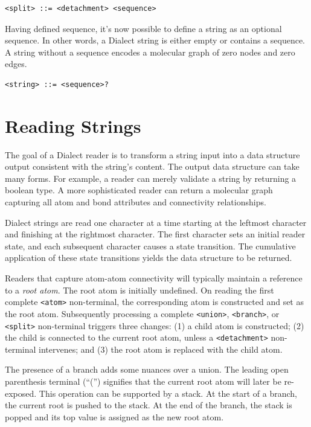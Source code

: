 \documentclass{article}
\def\ttt{\texttt}
\begin{document}
\begin{lstlisting}
<split> ::= <detachment> <sequence>
\end{lstlisting}

Having defined sequence, it's now possible to define a string as an optional sequence. In other words, a Dialect string is either empty or contains a sequence. A string without a sequence encodes a molecular graph of zero nodes and zero edges.

\begin{lstlisting}
<string> ::= <sequence>?
\end{lstlisting}

\section*{Reading Strings}

The goal of a Dialect reader is to transform a string input into a data structure output consistent with the string's content. The output data structure can take many forms. For example, a reader can merely validate a string by returning a boolean type. A more sophisticated reader can return a molecular graph capturing all atom and bond attributes and connectivity relationships.

Dialect strings are read one character at a time starting at the leftmost character and finishing at the rightmost character. The first character sets an initial reader state, and each subsequent character causes a state transition. The cumulative application of these state transitions yields the data structure to be returned.

Readers that capture atom-atom connectivity will typically maintain a reference to a \textit{root atom}. The root atom is initially undefined. On reading the first complete \ttt{<atom>} non-terminal, the corresponding atom is constructed and set as the root atom. Subsequently processing a complete \ttt{<union>}, \ttt{<branch>}, or \ttt{<split>} non-terminal triggers three changes: (1) a child atom is constructed; (2) the child is connected to the current root atom, unless a \ttt{<detachment>} non-terminal intervenes; and (3) the root atom is replaced with the child atom.

The presence of a branch adds some nuances over a union. The leading open parenthesis terminal (\enquote{(}) signifies that the current root atom will later be re-exposed. This operation can be supported by a stack. At the start of a branch, the current root is pushed to the stack. At the end of the branch, the stack is popped and its top value is assigned as the new root atom.
\end{document}
